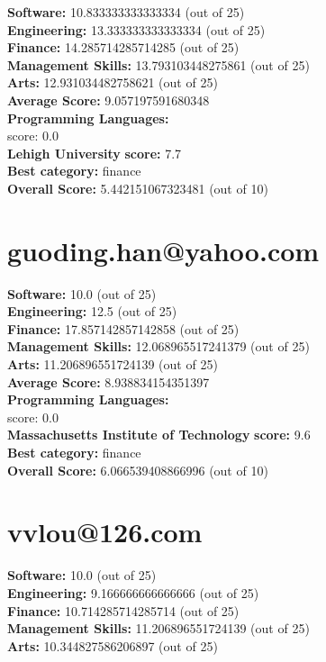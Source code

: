 \documentclass{article}
\begin{document}
\textbf{Software:} 10.833333333333334 (out of 25)\\
\textbf{Engineering: } 13.333333333333334 (out of 25)\\
\textbf{Finance:} 14.285714285714285 (out of 25)\\
\textbf{Management Skills:} 13.793103448275861 (out of 25)\\
\textbf{Arts:} 12.931034482758621 (out of 25)\\
\textbf{Average Score: } 9.057197591680348\\
\textbf{Programming Languages:} \\
score: 0.0\\
\textbf{Lehigh University} \textbf{score:} 7.7\\
\textbf{Best category: } finance\\
\textbf{Overall Score: }5.442151067323481 (out of 10)\section{guoding.han@yahoo.com}
\textbf{Software:} 10.0 (out of 25)\\
\textbf{Engineering: } 12.5 (out of 25)\\
\textbf{Finance:} 17.857142857142858 (out of 25)\\
\textbf{Management Skills:} 12.068965517241379 (out of 25)\\
\textbf{Arts:} 11.206896551724139 (out of 25)\\
\textbf{Average Score: } 8.938834154351397\\
\textbf{Programming Languages:} \\
score: 0.0\\
\textbf{Massachusetts Institute of Technology} \textbf{score:} 9.6\\
\textbf{Best category: } finance\\
\textbf{Overall Score: }6.066539408866996 (out of 10)\section{vvlou@126.com}
\textbf{Software:} 10.0 (out of 25)\\
\textbf{Engineering: } 9.166666666666666 (out of 25)\\
\textbf{Finance:} 10.714285714285714 (out of 25)\\
\textbf{Management Skills:} 11.206896551724139 (out of 25)\\
\textbf{Arts:} 10.344827586206897 (out of 25)\\
\end{document}
